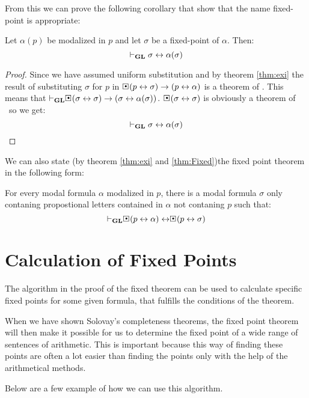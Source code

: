 \documentclass[../main.tex]{subfiles}
\begin{document}
From this we can prove the following corollary that show that the name
fixed-point is appropriate:
\begin{cor}
	Let $\alpha(p)$ be modalized in $p$ and let $\sigma$ be a fixed-point
	of $\alpha$. Then:
	\[\vdash_{\text{\textbf{GL}}}\sigma\leftrightarrow\alpha(\sigma)\]
\end{cor}
\begin{proof}
	Since we have assumed uniform substitution and by theorem \ref{thm:exi}
	the result of substituting $\sigma$ for $p$ in
	$\sBox(p\leftrightarrow\sigma)\rightarrow(p\leftrightarrow\alpha)$ is a
	theorem of \GL. This means that
	$\vdash_\GL\sBox(\sigma\leftrightarrow\sigma)\rightarrow(\sigma\leftrightarrow\alpha(\sigma))$.
	$\sBox(\sigma\leftrightarrow\sigma)$ is obviously a theorem of \GL\ so
	we get:
	\[\vdash_{\text{\textbf{GL}}}\sigma\leftrightarrow\alpha(\sigma)\]
\end{proof}
We can also state  (by theorem \ref{thm:exi} and \ref{thm:Fixed})the fixed
point theorem in the following form:

\begin{cor}
	\label{cor:Fixed}
	For every modal formula $\alpha$ modalized in $p$, there is a modal formula
	$\sigma$ only contaning propostional letters contained in $\alpha$ not
	contaning $p$ such that:
	\[\vdash_\GL\sBox(p\leftrightarrow\alpha)\leftrightarrow\sBox(p\leftrightarrow\sigma)\]
\end{cor}
\section{Calculation of Fixed Points}

The algorithm in the proof of the fixed theorem can be used to calculate
specific fixed points for some given formula, that fulfills the conditions of
the theorem. 

When we have shown Solovay's completeness theorems, the fixed point theorem
will then make it possible for us to determine the fixed point of a wide range
of sentences of arithmetic. This is important because this way of finding these
points are often a lot easier than finding the points only with the help of the
arithmetical methods.

Below are a few example of how we can use this algorithm.
\end{document}

